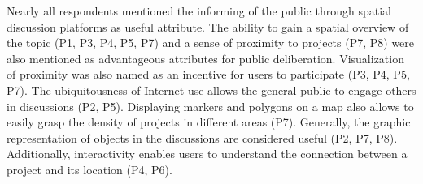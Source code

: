 Nearly all respondents mentioned the informing of the public through spatial discussion platforms as useful attribute. The ability to gain a spatial overview of the topic (P1, P3, P4, P5, P7) and a sense of proximity to projects (P7, P8) were also mentioned as advantageous attributes for public deliberation. Visualization of proximity was also named as an incentive for users to participate (P3, P4, P5, P7). The ubiquitousness of Internet use allows the general public to engage others in discussions (P2, P5). Displaying markers and polygons on a map also allows to easily grasp the density of projects in different areas (P7). Generally, the graphic representation of objects in the discussions are considered useful (P2, P7, P8). Additionally, interactivity enables users to understand the connection between a project and its location (P4, P6). 






    







